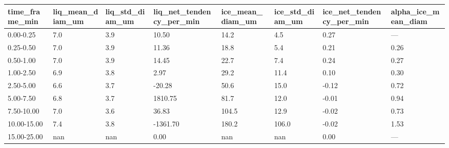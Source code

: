 \begin{tabular}{llllllll}
\toprule
time_frame_min & liq_mean_diam_um & liq_std_diam_um & liq_net_tendency_per_min & ice_mean_diam_um & ice_std_diam_um & ice_net_tendency_per_min & alpha_ice_mean_diam \\
\midrule
0.00-0.25 & 7.0 & 3.9 & 10.50 & 14.2 & 4.5 & 0.27 & — \\
0.25-0.50 & 7.0 & 3.9 & 11.36 & 18.8 & 5.4 & 0.21 & 0.26 \\
0.50-1.00 & 7.0 & 3.9 & 14.45 & 22.7 & 7.4 & 0.24 & 0.27 \\
1.00-2.50 & 6.9 & 3.8 & 2.97 & 29.2 & 11.4 & 0.10 & 0.30 \\
2.50-5.00 & 6.6 & 3.7 & -20.28 & 50.6 & 15.0 & -0.12 & 0.72 \\
5.00-7.50 & 6.8 & 3.7 & 1810.75 & 81.7 & 12.0 & -0.01 & 0.94 \\
7.50-10.00 & 7.0 & 3.6 & 36.83 & 104.5 & 12.9 & -0.02 & 0.73 \\
10.00-15.00 & 7.4 & 3.8 & -1361.70 & 180.2 & 106.0 & -0.02 & 1.53 \\
15.00-25.00 & nan & nan & 0.00 & nan & nan & 0.00 & — \\
\bottomrule
\end{tabular}

